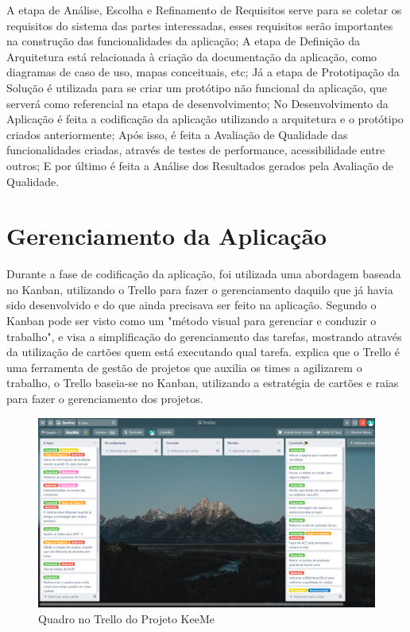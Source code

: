 A etapa de Análise, Escolha e Refinamento de Requisitos serve para se coletar os requisitos do sistema das partes interessadas, esses requisitos serão importantes na construção das funcionalidades da aplicação; A etapa de Definição da Arquitetura está relacionada à criação da documentação da aplicação, como diagramas de caso de uso, mapas conceituais, etc; Já a etapa de Prototipação da Solução é utilizada para se criar um protótipo não funcional da aplicação, que serverá como referencial na etapa de desenvolvimento; No Desenvolvimento da Aplicação é feita a codificação da aplicação utilizando a arquitetura e o protótipo criados anteriormente; Após isso, é feita a Avaliação de Qualidade das funcionalidades criadas, através de testes de performance, acessibilidade entre outros; E por último é feita a Análise dos Resultados gerados pela Avaliação de Qualidade.

\section{Gerenciamento da Aplicação}
\label{sec:gerenciamentoDaAplicacao}

Durante a fase de codificação da aplicação, foi utilizada uma abordagem baseada no Kanban, utilizando o Trello para fazer o gerenciamento daquilo que já havia sido desenvolvido e do que ainda precisava ser feito na aplicação.
Segundo \cite{mesh2020__metodo_kanban} o Kanban pode ser visto como um "método visual para gerenciar e conduzir o trabalho", e visa a simplificação do gerenciamento das tarefas, mostrando através da utilização de cartões quem está executando qual tarefa. \cite{trello} explica que o Trello é uma ferramenta de gestão de projetos que auxilia os times a agilizarem o trabalho, o Trello baseia-se no Kanban, utilizando a estratégia de cartões e raias para fazer o gerenciamento dos projetos.

\begin{figure}[H]
    \centering
    \includegraphics[width=\textwidth]{dados/figuras/Metodologia/trello.png}
    \caption{Quadro no Trello do Projeto KeeMe}
    \label{fig:screenTrelloKeeMe}
\end{figure}

